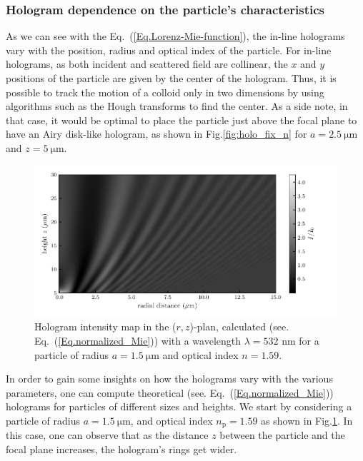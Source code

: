 \subsubsection{Hologram dependence on the particle's  characteristics}



As we can see with the Eq.~(\ref{Eq.Lorenz-Mie-function}), the in-line holograms vary with the position, radius and optical index of the particle. For in-line holograms, as both incident and scattered field are collinear, the $x$ and $y$ positions of the particle are given by the center of the hologram. Thus, it is possible to track the motion of a colloid only in two dimensions by using algorithms such as the Hough transforms to find the center. As a side note, in that case, it would be optimal to place the particle just above the focal plane to have an Airy disk-like hologram, as shown in Fig.\ref{fig:holo_fix_n} for $a = 2.5 ~ \mathrm{\mu m}$ and $z = 5 ~\mathrm{\mu m}$.

\begin{figure}[H]
	\centering
	\includegraphics{02_body/chapter2/images/holo_size_exemple/holos_only_z.pdf}
	\caption{Hologram intensity map in the ($r,z$)-plan, calculated (see. Eq.~(\ref{Eq.normalized_Mie})) with a wavelength $\lambda = 532$ nm for a particle of radius $a = 1.5 ~\mathrm{\mu m}$ and optical index $n = 1.59$.~\href{https://github.com/eXpensia/Confined-Brownian-Motion/blob/main/02_body/chapter2/images/holo_size_exemple/holosize_variation.ipynb}{\faGithub}}
	\label{fig:holo_onlyz}
\end{figure}

In order to gain some insights on how the holograms vary with the various parameters, one can compute theoretical (see. Eq.~(\ref{Eq.normalized_Mie})) holograms for particles of different sizes and heights. We start by considering a particle of radius $a = 1.5 ~ \mathrm{\mu m} $, and optical index $n_\mathrm{p}= 1.59 $ as shown in Fig.\ref{fig:holo_onlyz}. In this case, one can observe that as the distance $z$ between the particle and the focal plane increases, the hologram's rings get wider.

